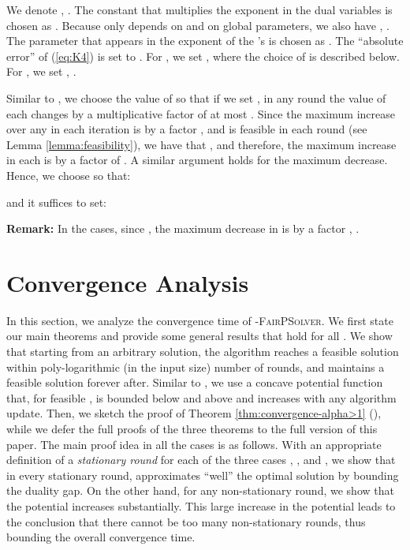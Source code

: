 \documentclass[11pt]{article}
\newif\iffullpaper
\begin{document}
We denote , . 
The constant  that multiplies the exponent in the dual variables  is chosen as . Because   only depends on  and on global parameters,  we also have , . The parameter  that appears in the exponent of the 's is chosen as . The ``absolute error'' of (\ref{eq:K4})  is set to . For , we set , where the choice of  is described below. For , we set , .

Similar to  \cite{AwerbuchKhandekar2009}, we choose the value of  so that if we set , in any round the value of each  changes by a multiplicative factor of at most . Since the maximum increase over any  in each iteration is by a factor , and  is feasible in each round (see Lemma \ref{lemma:feasibility}), we have that , and therefore, the maximum increase in each  is by a factor of . A similar argument holds for the maximum decrease.  Hence, we choose  so that:

and it suffices to set:


\noindent\textbf{Remark:} In the  cases, since , the maximum decrease in  is by a factor , .

\section{Convergence Analysis}\label{section:convergence}
 
In this section, we analyze the convergence time of \textsc{-FairPSolver}. We first state our main theorems and provide some general results that hold for all . We show that starting from an arbitrary solution, the algorithm reaches a feasible solution within poly-logarithmic (in the input size) number of rounds, and maintains a feasible solution forever after. Similar to \cite{AwerbuchKhandekar2009, dc-young2001sequential, kelly1998rate}, we use a concave potential function that, for feasible , is bounded below and above and increases with any algorithm update. \iffullpaper Then, we analyze the convergence time separately for three cases: , , and . 
With an appropriate definition of a \emph{stationary round} for each of the three cases, we show that in every stationary round,  approximates ``well'' the optimal solution by bounding the duality gap. On the other hand, for any non-stationary round, we show that the potential increases substantially. This large increase in the potential then leads to the conclusion that there cannot be too many non-stationary rounds, thus bounding the overall convergence time. \else Then, we sketch the proof of Theorem \ref{thm:convergence-alpha>1} (), while we defer the full proofs of  the three theorems to the full version of this paper. The main proof idea in all the cases is as follows. With an appropriate definition of a \emph{stationary round} for each of the three cases , , and , we show that in every stationary round,  approximates ``well'' the optimal solution by bounding the duality gap. On the other hand, for any non-stationary round, we show that the potential increases substantially. This large increase in the potential leads to the conclusion that there cannot be too many non-stationary rounds, thus bounding the overall convergence time. \fi
\end{document}
